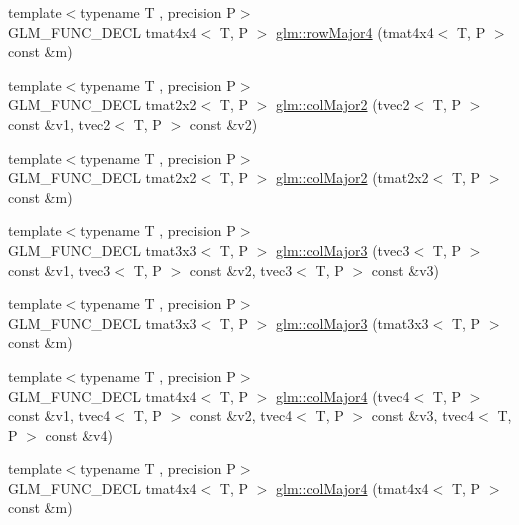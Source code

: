 \begin{DoxyCompactItemize}
\item 
{\footnotesize template$<$typename T , precision P$>$ }\\G\+L\+M\+\_\+\+F\+U\+N\+C\+\_\+\+D\+E\+C\+L tmat4x4$<$ T, P $>$ \hyperlink{group__gtx__matrix__major__storage_ga85771a88c114a088a0414bcfce55e729}{glm\+::row\+Major4} (tmat4x4$<$ T, P $>$ const \&m)
\item 
{\footnotesize template$<$typename T , precision P$>$ }\\G\+L\+M\+\_\+\+F\+U\+N\+C\+\_\+\+D\+E\+C\+L tmat2x2$<$ T, P $>$ \hyperlink{group__gtx__matrix__major__storage_ga599fff4f1c65912b256a82138ebcca37}{glm\+::col\+Major2} (tvec2$<$ T, P $>$ const \&v1, tvec2$<$ T, P $>$ const \&v2)
\item 
{\footnotesize template$<$typename T , precision P$>$ }\\G\+L\+M\+\_\+\+F\+U\+N\+C\+\_\+\+D\+E\+C\+L tmat2x2$<$ T, P $>$ \hyperlink{group__gtx__matrix__major__storage_ga5cfd25de9d5b4c6a825085f38ddfeff7}{glm\+::col\+Major2} (tmat2x2$<$ T, P $>$ const \&m)
\item 
{\footnotesize template$<$typename T , precision P$>$ }\\G\+L\+M\+\_\+\+F\+U\+N\+C\+\_\+\+D\+E\+C\+L tmat3x3$<$ T, P $>$ \hyperlink{group__gtx__matrix__major__storage_ga3a55e2948193e91733e434e7cc3c1540}{glm\+::col\+Major3} (tvec3$<$ T, P $>$ const \&v1, tvec3$<$ T, P $>$ const \&v2, tvec3$<$ T, P $>$ const \&v3)
\item 
{\footnotesize template$<$typename T , precision P$>$ }\\G\+L\+M\+\_\+\+F\+U\+N\+C\+\_\+\+D\+E\+C\+L tmat3x3$<$ T, P $>$ \hyperlink{group__gtx__matrix__major__storage_gaa93f3dcc47ced18e5db4a853363d9386}{glm\+::col\+Major3} (tmat3x3$<$ T, P $>$ const \&m)
\item 
{\footnotesize template$<$typename T , precision P$>$ }\\G\+L\+M\+\_\+\+F\+U\+N\+C\+\_\+\+D\+E\+C\+L tmat4x4$<$ T, P $>$ \hyperlink{group__gtx__matrix__major__storage_ga2829de096bb67ab5cd670958f3d402b6}{glm\+::col\+Major4} (tvec4$<$ T, P $>$ const \&v1, tvec4$<$ T, P $>$ const \&v2, tvec4$<$ T, P $>$ const \&v3, tvec4$<$ T, P $>$ const \&v4)
\item 
{\footnotesize template$<$typename T , precision P$>$ }\\G\+L\+M\+\_\+\+F\+U\+N\+C\+\_\+\+D\+E\+C\+L tmat4x4$<$ T, P $>$ \hyperlink{group__gtx__matrix__major__storage_ga7592acfd27da055e2d7c39564cf8803d}{glm\+::col\+Major4} (tmat4x4$<$ T, P $>$ const \&m)
\end{DoxyCompactItemize}


